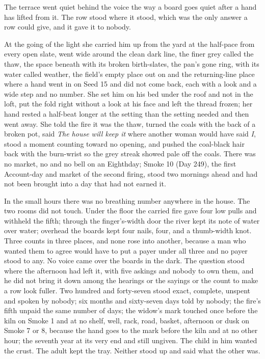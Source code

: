 The terrace went quiet behind the voice the way a board goes quiet after a hand has lifted from it. The row stood where it stood, which was the only answer a row could give, and it gave it to nobody.

\scenebreak

At the going of the light she carried him up from the yard at the half-pace from every open slate, went wide around the clean dark line, the finer grey called the thaw, the space beneath  with its broken birth-slates, the pan's gone ring,  with its water called weather, the field's empty place out on  and the returning-line place where a hand went in on Seed 15 and did not come back, each with a look and a wide step and no number. She set him on his bed under the roof and not in the loft, put the fold right without a look at his face and left the thread frozen; her hand rested a half-beat longer at the setting than the setting needed and then went away. She told the fire it was the thaw, turned the coals with the back of a broken pot, said \emph{The house will keep it} where another woman would have said \emph{I}, stood a moment counting toward no opening, and pushed the coal-black hair back with the burn-wrist so the grey streak showed pale off the coals. There was no market, no  and no bell on an Eighthday; Smoke 10 (Day 249), the first Account-day and market of the second firing, stood two mornings ahead and had not been brought into a day that had not earned it.

In the small hours there was no breathing number anywhere in the house. The two rooms did not touch. Under the floor the carried fire gave four low pulls and withheld the fifth; through the finger's-width door the river kept its note of water over water; overhead the boards kept four nails, four, and a thumb-width knot. Three counts in three places, and none rose into another, because a man who wanted them to agree would have to put a payer under all three and no payer stood to any. No voice came over the boards in the dark. The question stood where the afternoon had left it, with five askings and nobody to own them, and he did not bring it down among the hearings or the sayings or the count to make a row look fuller. Two hundred and forty-seven stood exact, complete, unspent and spoken by nobody; six months and sixty-seven days told by nobody; the fire's fifth unpaid the same number of days; the widow's mark touched once before the kiln on Smoke 1 and at no shelf, well, rack, road, basket, afternoon or dusk on Smoke 7 or 8, because the hand goes to the mark before the kiln and at no other hour; the seventh year at its very end and still ungiven. The child in him wanted the crust. The adult kept the tray. Neither stood up and said what the other was.

